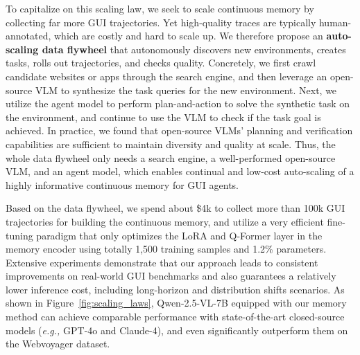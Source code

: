\documentclass{article} %
\newcommand{\eg}{\emph{e.g.,}\xspace}
\begin{document}
To capitalize on this scaling law, we seek to scale continuous memory by collecting far more GUI trajectories. Yet high-quality traces are typically human-annotated, which are costly and hard to scale up. We therefore propose an \textbf{auto-scaling data flywheel} that autonomously discovers new environments, creates tasks, rolls out trajectories, and checks quality. 
Concretely, we first crawl candidate websites or apps through the search engine, and then leverage an open-source VLM to synthesize the task queries for the new environment. Next, we utilize the agent model to perform plan-and-action to solve the synthetic task on the environment, and continue to use the VLM to check if the task goal is achieved.
In practice, we found that open-source VLMs' planning and verification capabilities are sufficient to maintain diversity and quality at scale.
Thus, the whole data flywheel only needs a search engine, a well-performed open-source VLM, and an agent model, which enables continual and low-cost auto-scaling of a highly informative continuous memory for GUI agents.


% 


Based on the data flywheel, we spend about \$4k to collect more than 100k GUI trajectories for building the continuous memory, and utilize a very efficient fine-tuning paradigm that only optimizes the LoRA \citep{hu2021lora} and Q-Former\citep{qformer} layer in the memory encoder using totally 1,500 training samples and 1.2\% parameters.
Extensive experiments demonstrate that our approach leads to consistent improvements on real-world GUI benchmarks and also guarantees a relatively lower inference cost, including long-horizon and distribution shifts scenarios.
As shown in Figure~\ref{fig:scaling_laws}, Qwen-2.5-VL-7B \citep{yang2024qwen2.5} equipped with our memory method can achieve comparable performance with state-of-the-art closed-source models (\eg GPT-4o \citep{openai2024gpt4o} and Claude-4\citep{anthropic2024claude4}), and even significantly outperform them on the Webvoyager dataset.
\end{document}
